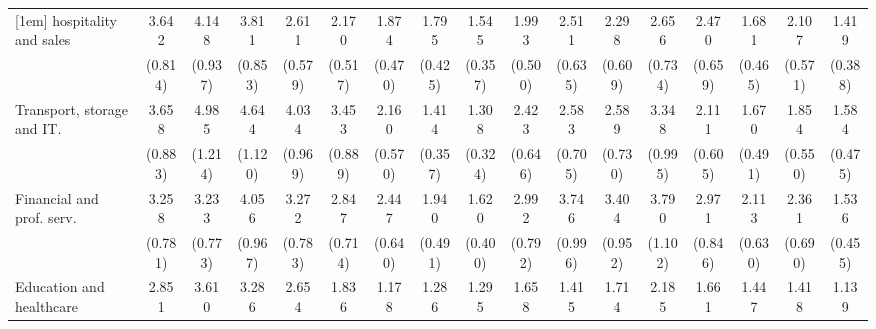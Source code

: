 {\begin{tabular}{l*{16}{c}}
[1em]
hospitality and sales&       3.642\sym{***}&       4.148\sym{***}&       3.811\sym{***}&       2.611\sym{***}&       2.170\sym{**} &       1.874\sym{*}  &       1.795\sym{*}  &       1.545         &       1.993\sym{**} &       2.511\sym{***}&       2.298\sym{**} &       2.656\sym{***}&       2.470\sym{***}&       1.681         &       2.107\sym{**} &       1.419         \\
                    &     (0.814)         &     (0.937)         &     (0.853)         &     (0.579)         &     (0.517)         &     (0.470)         &     (0.425)         &     (0.357)         &     (0.500)         &     (0.635)         &     (0.609)         &     (0.734)         &     (0.659)         &     (0.465)         &     (0.571)         &     (0.388)         \\
[1em]
Transport, storage and IT.&       3.658\sym{***}&       4.985\sym{***}&       4.644\sym{***}&       4.034\sym{***}&       3.453\sym{***}&       2.160\sym{**} &       1.414         &       1.308         &       2.423\sym{***}&       2.583\sym{***}&       2.589\sym{***}&       3.348\sym{***}&       2.111\sym{**} &       1.670         &       1.854\sym{*}  &       1.584         \\
                    &     (0.883)         &     (1.214)         &     (1.120)         &     (0.969)         &     (0.889)         &     (0.570)         &     (0.357)         &     (0.324)         &     (0.646)         &     (0.705)         &     (0.730)         &     (0.995)         &     (0.605)         &     (0.491)         &     (0.550)         &     (0.475)         \\
[1em]
Financial and prof. serv.&       3.258\sym{***}&       3.233\sym{***}&       4.056\sym{***}&       3.272\sym{***}&       2.847\sym{***}&       2.447\sym{***}&       1.940\sym{**} &       1.620         &       2.992\sym{***}&       3.746\sym{***}&       3.404\sym{***}&       3.790\sym{***}&       2.971\sym{***}&       2.113\sym{*}  &       2.361\sym{**} &       1.536         \\
                    &     (0.781)         &     (0.773)         &     (0.967)         &     (0.783)         &     (0.714)         &     (0.640)         &     (0.491)         &     (0.400)         &     (0.792)         &     (0.996)         &     (0.952)         &     (1.102)         &     (0.846)         &     (0.630)         &     (0.690)         &     (0.455)         \\
[1em]
Education and healthcare&       2.851\sym{***}&       3.610\sym{***}&       3.286\sym{***}&       2.654\sym{***}&       1.836\sym{*}  &       1.178         &       1.286         &       1.295         &       1.658         &       1.415         &       1.714         &       2.185\sym{*}  &       1.661         &       1.447         &       1.418         &       1.139         \\

\end{tabular}}
